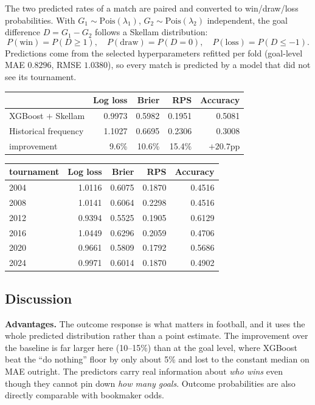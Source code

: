 \documentclass[11pt,a4paper]{article}
\begin{document}
The two predicted rates of a match are paired and converted to
win/draw/loss probabilities. With
$G_1 \sim \text{Pois}(\lambda_1)$, $G_2 \sim \text{Pois}(\lambda_2)$
independent, the goal difference $D = G_1 - G_2$ follows a Skellam
distribution:
\[
  P(\text{win}) = P(D \geq 1), \quad
  P(\text{draw}) = P(D = 0), \quad
  P(\text{loss}) = P(D \leq -1).
\]
Predictions come from the selected hyperparameters refitted per fold
(goal-level MAE $0.8296$, RMSE $1.0380$), so every match is predicted by
a model that did not see its tournament.

\begin{center}
\begin{tabular}{lrrrr}
  \toprule
   & Log loss & Brier & RPS & Accuracy \\
  \midrule
  XGBoost $+$ Skellam  & 0.9973 & 0.5982 & 0.1951 & 0.5081 \\
  Historical frequency & 1.1027 & 0.6695 & 0.2306 & 0.3008 \\
  \midrule
  improvement & 9.6\% & 10.6\% & 15.4\% & $+20.7$pp \\
  \bottomrule
\end{tabular}
\end{center}

\begin{center}
\begin{tabular}{lrrrr}
  \toprule
  tournament & Log loss & Brier & RPS & Accuracy \\
  \midrule
  2004 & 1.0116 & 0.6075 & 0.1870 & 0.4516 \\
  2008 & 1.0141 & 0.6064 & 0.2298 & 0.4516 \\
  2012 & 0.9394 & 0.5525 & 0.1905 & 0.6129 \\
  2016 & 1.0449 & 0.6296 & 0.2059 & 0.4706 \\
  2020 & 0.9661 & 0.5809 & 0.1792 & 0.5686 \\
  2024 & 0.9971 & 0.6014 & 0.1870 & 0.4902 \\
  \bottomrule
\end{tabular}
\end{center}

\subsection*{Discussion}

\textbf{Advantages.} The outcome response is what matters in football,
and it uses the whole predicted distribution rather than a point estimate.
The improvement over the baseline is far larger here (10--15\%) than at
the goal level, where XGBoost beat the ``do nothing'' floor by only about
5\% and lost to the constant median on MAE outright. The predictors carry
real information about \emph{who wins} even though they cannot pin down
\emph{how many goals}. Outcome probabilities are also directly comparable
with bookmaker odds.
\end{document}
